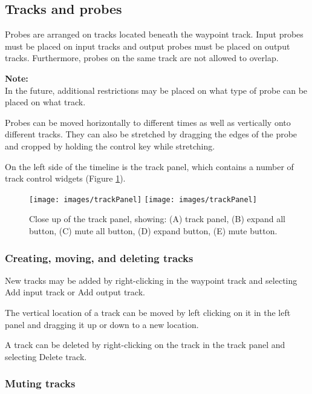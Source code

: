 \documentclass{article}
\begin{document}
\subsection{Tracks and probes}
\label{probesAndTracks:sec}

Probes are arranged on tracks located beneath the waypoint track.  Input
probes must be placed on input tracks and output probes must be placed
on output tracks.  Furthermore, probes on the same track are not allowed
to overlap.

\begin{sideblock}
{\bf Note:}\\
In the future, additional restrictions may be placed on
what type of probe can be placed on what track.
\end{sideblock}

Probes can be moved horizontally to different times as well as vertically
onto different tracks.  They can also be stretched by dragging the edges
of the probe and cropped by holding the control key while stretching.

On the left side of the timeline is the track panel, which
contains a number of track control widgets (Figure \ref{trackPanelFig}).

\begin{figure}
\begin{center}
\iflatexml
\texttt{[image: images/trackPanel]}
\else
\texttt{[image: images/trackPanel]}
\fi
\end{center}
\caption{Close up of the track panel, showing: (A) track panel, (B)
expand all button, (C) mute all button, (D) expand button, (E) mute
button.}%
\label{trackPanelFig}
\end{figure}

\subsubsection{Creating, moving, and deleting tracks}

New tracks may be added by right-clicking in the waypoint track and
selecting {\sf Add input track} or {\sf Add output track}. 

The vertical location of a track can be moved by left clicking on it
in the left panel and dragging it up or down to a new location.

A track can be deleted by right-clicking on the track in
the track panel and selecting {\sf Delete track}.

\subsubsection{Muting tracks}
\end{document}
